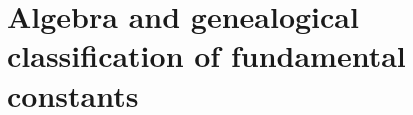 \chapter{Algebra and genealogical classification of fundamental constants}
\label{chap:p3-final:27:algebra_clasificacion}



